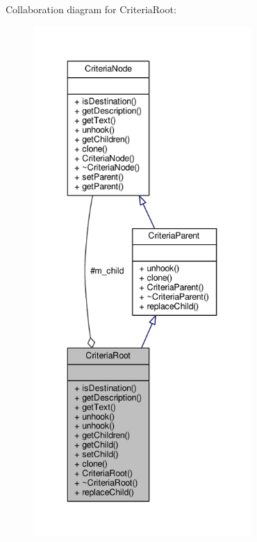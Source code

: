 Collaboration diagram for Criteria\+Root\+:
\nopagebreak
\begin{figure}[H]
\begin{center}
\leavevmode
\includegraphics[height=550pt]{d8/dca/classCriteriaRoot__coll__graph}
\end{center}
\end{figure}
